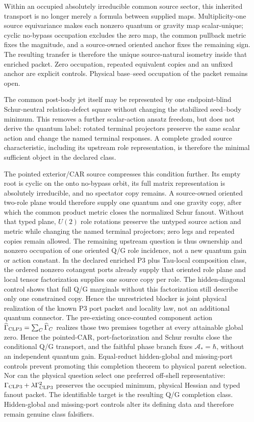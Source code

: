 \documentclass[11pt]{article}
\begin{document}
Within an occupied absolutely irreducible common source sector, this inherited
transport is no longer merely a formula between supplied maps.  Multiplicity-one
source equivariance makes each nonzero quantum or gravity map scalar-unique;
cyclic no-bypass occupation excludes the zero map, the common pullback metric
fixes the magnitude, and a source-owned oriented anchor fixes the remaining
sign.  The resulting transfer is therefore the unique source-natural isometry
inside that enriched packet.  Zero occupation, repeated equivalent copies and
an unfixed anchor are explicit controls.  Physical base--seed occupation of
the packet remains open.

The common post-body jet itself may be represented by one endpoint-blind
Schur-neutral relation-defect square without changing the stabilized
seed--body minimum.  This removes a further scalar-action ansatz freedom, but
does not derive the quantum label: rotated terminal projectors preserve the
same scalar action and change the named terminal responses.  A complete
graded source characteristic, including its upstream role representation, is
therefore the minimal sufficient object in the declared class.

The pointed exterior/CAR source compresses this condition further.  Its empty
root is cyclic on the onto no-bypass orbit, its full matrix representation is
absolutely irreducible, and no spectator copy remains.  A source-owned
oriented two-role plane would therefore supply one quantum and one gravity
copy, after which the common product metric closes the normalized Schur
fanout.  Without that typed plane, $U(2)$ role rotations preserve the untyped
source action and metric while changing the named terminal projectors; zero
legs and repeated copies remain allowed.  The remaining upstream question is
thus ownership and nonzero occupation of one oriented Q/G role incidence,
not a new quantum gain or action constant.  In the declared enriched P3 plus
Tau-local composition class, the ordered nonzero cotangent ports already
supply that oriented role plane and local tensor factorization supplies one
source copy per role.  The hidden-diagonal control shows that full Q/G
marginals without this factorization still describe only one constrained
copy.  Hence the unrestricted blocker is joint physical realization of the
known P3 port packet and locality law, not an additional quantum connector.
The pre-existing once-counted component action
$\widehat\Gamma_{\rm CLP3}=\sum_C\widehat\Gamma_C$ realizes those two
premises together at every attainable global zero. Hence the pointed-CAR,
port-factorization and Schur results close the conditional Q/G transport, and
the faithful phase branch fixes $\mathcal A_*=\hbar$, without an independent
quantum gain. Equal-reduct hidden-global and missing-port controls prevent
promoting this completion theorem to physical parent selection.
Nor can the physical question select one preferred off-shell representative:
$\Gamma_{\rm CLP3}+\lambda\Gamma_{\rm CLP3}^2$ preserves the occupied minimum,
physical Hessian and typed fanout packet.  The identifiable target is the
resulting Q/G completion class.  Hidden-global and missing-port controls alter
its defining data and therefore remain genuine class falsifiers.
\end{document}
